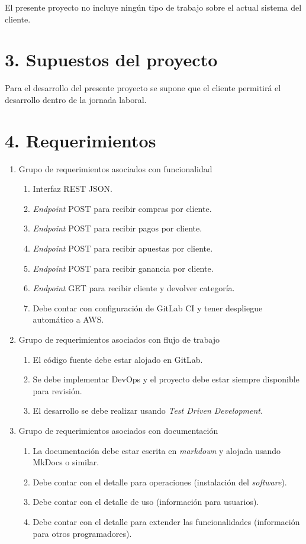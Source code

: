 \documentclass[11pt]{charter}
\begin{document}
El presente proyecto no incluye ningún tipo de trabajo sobre el actual sistema del cliente.

\section{3. Supuestos del proyecto}
\label{sec:supuestos}

Para el desarrollo del presente proyecto se supone que el cliente permitirá el desarrollo dentro de la jornada laboral.

\section{4. Requerimientos}
\label{sec:requerimientos}

\begin{enumerate}
\item Grupo de requerimientos asociados con funcionalidad
	\begin{enumerate}
	\item Interfaz REST JSON.
	\item \textit{Endpoint} POST para recibir compras por cliente.
	\item \textit{Endpoint} POST para recibir pagos por cliente.
	\item \textit{Endpoint} POST para recibir apuestas por cliente.
	\item \textit{Endpoint} POST para recibir ganancia por cliente.
	\item \textit{Endpoint} GET para recibir cliente y devolver categoría.
  \item Debe contar con configuración de GitLab CI y tener despliegue automático a AWS.
	\end{enumerate}
\item Grupo de requerimientos asociados con flujo de trabajo
	\begin{enumerate}
	\item El código fuente debe estar alojado en GitLab.
	\item Se debe implementar DevOps y el proyecto debe estar siempre disponible para revisión.
	\item El desarrollo se debe realizar usando \textit{Test Driven Development}.
	\end{enumerate}
\item Grupo de requerimientos asociados con documentación
  \begin{enumerate}
    \item La documentación debe estar escrita en \textit{markdown} y alojada usando MkDocs o similar.
    \item Debe contar con el detalle para operaciones (instalación del \textit{software}).
    \item Debe contar con el detalle de uso (información para usuarios).
    \item Debe contar con el detalle para extender las funcionalidades (información para otros programadores).
  \end{enumerate}
\end{enumerate}
\end{document}
